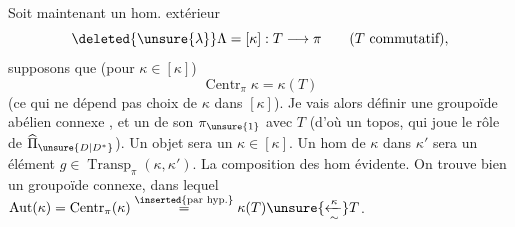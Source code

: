 Soit maintenant un hom. extérieur 
\[
\deleted{\unsure{\lambda}}\Lambda=[\kappa]:T\longrightarrow\pi
\qquad (T\text{ commutatif}),
\]
supposons que (pour \(\kappa\in[\kappa]\))
\[
\operatorname{Centr}_\pi\kappa=\kappa(T)
\]
(ce qui ne dépend pas  choix de \(\kappa\) dans
\([\kappa]\)). Je vais alors définir une
 groupoïde abélien connexe \inserted{\(\Pi_\Lambda\)}, et un
 de son \(\pi_{\unsure{1}}\) avec \(T\) 
(d'où un topos, qui joue le rôle de
\(\widehat{\Pi}_{\unsure{D|D^*}}\)). Un objet sera un \(\kappa\in[\kappa]\).
Un hom de \(\kappa\) dans \(\kappa'\) sera un
élément \(g\in\operatorname{Transp}_\pi(\kappa,\kappa')\). 
La composition des hom évidente. On
trouve bien un groupoïde connexe, dans
lequel \(\operatorname{Aut}(\kappa)=\operatorname{Centr}_\pi(\kappa)\overset{\inserted{\text{par hyp.}}}{=}\kappa(T)\unsure{\xleftarrow[\sim]{\kappa}}T\).

